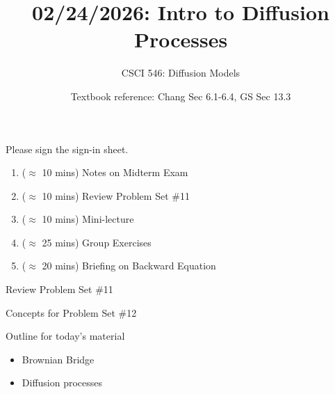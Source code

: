 \documentclass[10pt]{beamer}
\begin{document}




\title{02/24/2026: Intro to Diffusion Processes}
\author{CSCI 546: Diffusion Models}
\date{Textbook reference: Chang Sec 6.1-6.4, GS Sec  13.3}

\begin{frame}
    \titlepage 
\end{frame}

\begin{frame}

\begin{mygreenbox}[title=Announcement (Sign-in Sheet)]
Please sign the sign-in sheet.
\end{mygreenbox}

\vfill 


\begin{myyellowbox}[title=Agenda]
\begin{enumerate}
	\item ($\approx$ 10 mins) Notes on Midterm Exam
	\item  ($\approx$ 10 mins) Review Problem Set \#11
	\item  ($\approx$ 10 mins) Mini-lecture
	\item ($\approx$ 25 mins) Group Exercises
	\item ($\approx$ 20 mins) Briefing on Backward Equation
\end{enumerate}

\end{myyellowbox}


	
\end{frame}

\begin{frame}[standout]
Review Problem Set \#11
\end{frame}

\begin{frame}[standout]
Concepts for Problem Set \#12
\end{frame}


\begin{frame}[standout]
Outline for today's material
\begin{itemize}
\item \textbullet \quad \alert{Brownian Bridge}
\item \textbullet \quad Diffusion processes
\end{itemize}

\end{frame}
\end{document}
